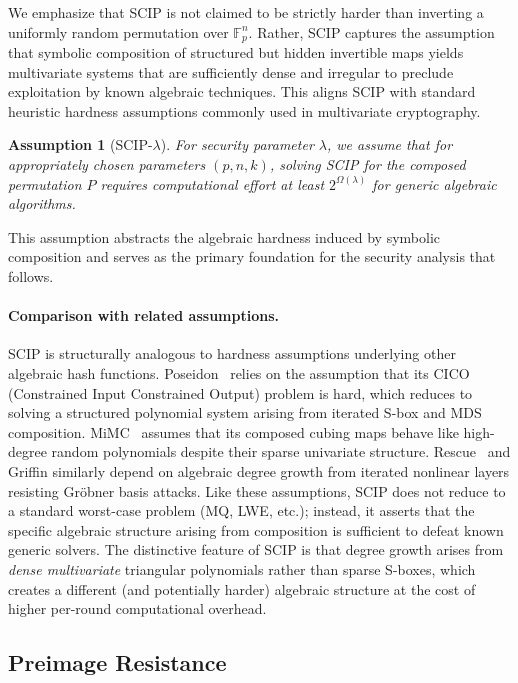 ﻿\documentclass[english]{aucmcs}
\newcommand{\Fp}{\mathbb{F}_p}
\newtheorem{assumption}{Assumption}[section]
\begin{document}
We emphasize that SCIP is not claimed to be strictly harder than inverting
a uniformly random permutation over $\Fp^n$. Rather, SCIP captures the
assumption that symbolic composition of structured but hidden invertible
maps yields multivariate systems that are sufficiently dense and irregular
to preclude exploitation by known algebraic techniques. This aligns SCIP
with standard heuristic hardness assumptions commonly used in multivariate
cryptography.


\begin{assumption}[SCIP-$\lambda$]
\label{asm:scip}
For security parameter $\lambda$, we assume that for appropriately chosen parameters $(p,n,k)$, solving SCIP for the composed permutation $P$ requires computational effort at least $2^{\Omega(\lambda)}$ for generic algebraic algorithms.
\end{assumption}

This assumption abstracts the algebraic hardness induced by symbolic composition and serves as the primary foundation for the security analysis that follows.

\paragraph{Comparison with related assumptions.}
SCIP is structurally analogous to hardness assumptions underlying other
algebraic hash functions. Poseidon~\cite{Poseidon} relies on the
assumption that its CICO (Constrained Input Constrained Output) problem
is hard, which reduces to solving a structured polynomial system arising
from iterated S-box and MDS composition. MiMC~\cite{MiMC} assumes that
its composed cubing maps behave like high-degree random polynomials
despite their sparse univariate structure. Rescue~\cite{Rescue} and
Griffin similarly depend on algebraic degree growth from iterated
nonlinear layers resisting Gr\"obner basis attacks.
Like these assumptions, SCIP does not reduce to a standard worst-case
problem (MQ, LWE, etc.); instead, it asserts that the specific
algebraic structure arising from composition is sufficient to defeat
known generic solvers. The distinctive feature of SCIP is that degree
growth arises from \emph{dense multivariate} triangular polynomials
rather than sparse S-boxes, which creates a different (and potentially
harder) algebraic structure at the cost of higher per-round
computational overhead.



\subsection{Preimage Resistance}
\end{document}
